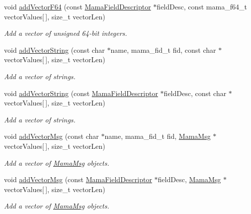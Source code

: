 \begin{DoxyCompactItemize}
void \hyperlink{classWombat_1_1MamaMsg_abe5aa90f4e89a99826528c5f11120455}{addVectorF64} (const \hyperlink{classWombat_1_1MamaFieldDescriptor}{MamaFieldDescriptor} $\ast$fieldDesc, const mama\_\-f64\_\-t vectorValues\mbox{[}$\,$\mbox{]}, size\_\-t vectorLen)
\begin{DoxyCompactList}\small\item\em Add a vector of unsigned 64-\/bit integers. \item\end{DoxyCompactList}\item 
void \hyperlink{classWombat_1_1MamaMsg_a1d1b50cbac49d0af7520223b1e23e099}{addVectorString} (const char $\ast$name, mama\_\-fid\_\-t fid, const char $\ast$vectorValues\mbox{[}$\,$\mbox{]}, size\_\-t vectorLen)
\begin{DoxyCompactList}\small\item\em Add a vector of strings. \item\end{DoxyCompactList}\item 
void \hyperlink{classWombat_1_1MamaMsg_a9f8de3a5b37ecf6b2b5d328626f020ec}{addVectorString} (const \hyperlink{classWombat_1_1MamaFieldDescriptor}{MamaFieldDescriptor} $\ast$fieldDesc, const char $\ast$vectorValues\mbox{[}$\,$\mbox{]}, size\_\-t vectorLen)
\begin{DoxyCompactList}\small\item\em Add a vector of strings. \item\end{DoxyCompactList}\item 
void \hyperlink{classWombat_1_1MamaMsg_a2d66afc1da9505582e4877441a0fe084}{addVectorMsg} (const char $\ast$name, mama\_\-fid\_\-t fid, \hyperlink{classWombat_1_1MamaMsg}{MamaMsg} $\ast$vectorValues\mbox{[}$\,$\mbox{]}, size\_\-t vectorLen)
\begin{DoxyCompactList}\small\item\em Add a vector of \hyperlink{classWombat_1_1MamaMsg}{MamaMsg} objects. \item\end{DoxyCompactList}\item 
void \hyperlink{classWombat_1_1MamaMsg_a644516306b81a3cd8a368b374a39737f}{addVectorMsg} (const \hyperlink{classWombat_1_1MamaFieldDescriptor}{MamaFieldDescriptor} $\ast$fieldDesc, \hyperlink{classWombat_1_1MamaMsg}{MamaMsg} $\ast$vectorValues\mbox{[}$\,$\mbox{]}, size\_\-t vectorLen)
\begin{DoxyCompactList}\small\item\em Add a vector of \hyperlink{classWombat_1_1MamaMsg}{MamaMsg} objects. \item\end{DoxyCompactList}\item 

\end{DoxyCompactItemize}
